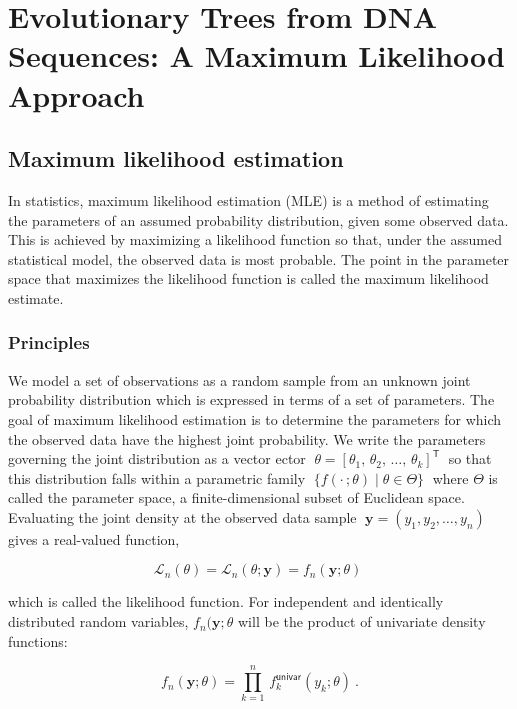 \graphicspath{{chapters/15/}}
\chapter{Evolutionary Trees from DNA Sequences: A Maximum Likelihood Approach}
\section{Maximum likelihood estimation}
In statistics, maximum likelihood estimation (MLE) is a method of estimating the parameters of an assumed probability distribution, given some observed data. This is achieved by maximizing a likelihood function so that, under the assumed statistical model, the observed data is most probable. The point in the parameter space that maximizes the likelihood function is called the maximum likelihood estimate.
\subsection{Principles}
We model a set of observations as a random sample from an unknown joint probability distribution which is expressed in terms of a set of parameters. The goal of maximum likelihood estimation is to determine the parameters for which the observed data have the highest joint probability. We write the parameters governing the joint distribution as a vector ector 
$\;\theta =\left[\theta _{1},\,\theta _{2},\,\ldots ,\,\theta _{k}\right]^{\mathsf {T}}\;$
so that this distribution falls within a parametric family 
$\;\{f(\cdot \,;\theta )\mid \theta \in \Theta \}\;$ where $\Theta$ is called the parameter space, a finite-dimensional subset of Euclidean space.
Evaluating the joint density at the observed data sample 
$ \;\mathbf {y} =(y_{1},y_{2},\ldots ,y_{n})\;$
gives a real-valued function,

\begin{equation}
{\mathcal {L}}_{n}(\theta )={\mathcal {L}}_{n}(\theta ;\mathbf {y} )=f_{n}(\mathbf {y} ;\theta )\;
\end{equation}

which is called the likelihood function. For independent and identically distributed random variables, $ f_{n}(\mathbf {y} ;\theta $
will be the product of univariate density functions:

\begin{equation}
{\displaystyle f_{n}(\mathbf {y} ;\theta )=\prod _{k=1}^{n}\,f_{k}^{\mathsf {univar}}(y_{k};\theta )~.}
\end{equation}

